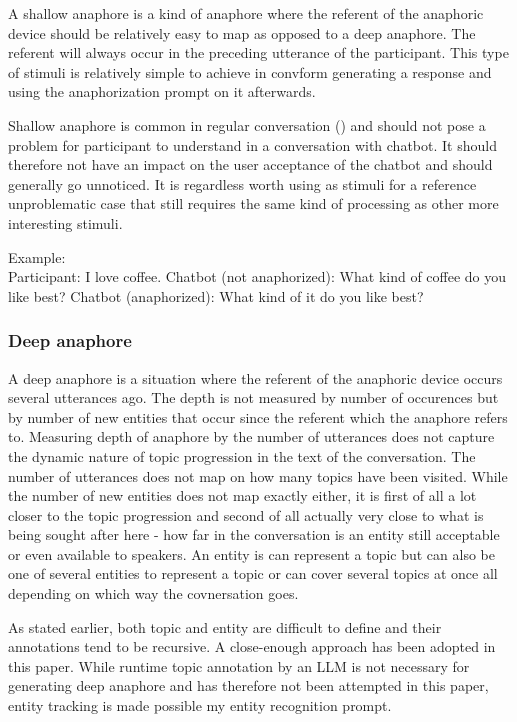 \documentclass[12pt]{report}
\begin{document}
{A shallow anaphore is a kind of anaphore
where the referent of the anaphoric device
should be relatively easy to map
as opposed to a deep anaphore.
The referent will always occur
in the preceding utterance of the participant.
This type of stimuli is relatively simple to achieve
in convform
generating a response
and using the anaphorization prompt on it afterwards.

Shallow anaphore is common in regular conversation ()
and should not pose a problem for participant to understand
in a conversation with chatbot.
It should therefore not have an impact
on the user acceptance of the chatbot
and should generally go unnoticed.
It is regardless worth using as stimuli
for a reference unproblematic case
that still requires the same kind of processing
as other more interesting stimuli.

Example: \\
Participant: I love coffee.
Chatbot (not anaphorized): What kind of coffee do you like best?
Chatbot (anaphorized): What kind of it do you like best?

\subsubsection{Deep anaphore}

A deep anaphore is a situation
where the referent of the anaphoric device
occurs several utterances ago.
The depth is not measured by number of occurences
but by number of new entities that occur
since the referent which the anaphore refers to.
Measuring depth of anaphore by the number of utterances
does not capture the dynamic nature
of topic progression in the text of the conversation.
The number of utterances does not map
on how many topics have been visited.
While the number of new entities does not
map exactly either,
it is first of all a lot closer to the topic progression
and second of all actually very close to
what is being sought after here -
how far in the conversation is an entity
still acceptable or even available to speakers.
An entity is can represent a topic
but can also be one of several entities to represent a topic
or can cover several topics at once
all depending on which way the covnersation goes.

\par
As stated earlier,
both topic and entity are difficult to define
and their annotations tend to be recursive.
A close-enough approach has been adopted in this paper.
While runtime topic annotation by an LLM
is not necessary for generating deep anaphore
and has therefore not been attempted in this paper,
entity tracking is made possible my
entity recognition prompt.

}
\end{document}
